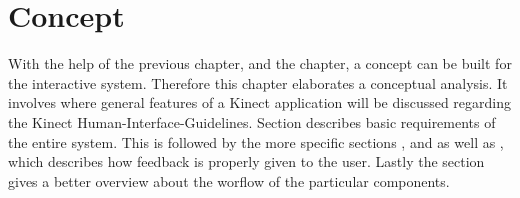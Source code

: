 \chapter{Concept}

With the help of the previous \textbf{} chapter, and the \textbf{} chapter, a concept can be built for the interactive system. Therefore this chapter elaborates a conceptual analysis. It involves \textbf{} where general features of a Kinect application will be discussed regarding the Kinect Human-Interface-Guidelines. Section \textbf{} describes basic requirements of the entire system. This is followed by the more specific sections \textbf{}, \textbf{} and \textbf{} as well as \textbf{}, which describes how feedback is properly given to the user. Lastly the section \textbf{} gives a better overview about the worflow of the particular components.

